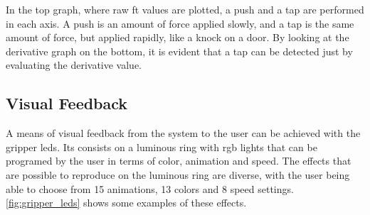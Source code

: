 \par In the top graph, where raw \ac{ft} values are plotted, a push and a tap are performed in each axis. A push is an amount of force applied slowly, and a tap is the same amount of force, but applied rapidly, like a knock on a door. By looking at the derivative graph on the bottom, it is evident that a tap can be detected just by evaluating the derivative value. 



\subsection{Visual Feedback}


\par A means of visual feedback from the system to the user can be achieved with the gripper \acp{led}. Its consists on a luminous ring with \ac{rgb} lights that can be programed by the user in terms of color, animation and speed. The effects that are possible to reproduce on the luminous ring are diverse, with the user being able to choose from 15 animations, 13 colors and 8 speed settings. \autoref{fig:gripper_leds} shows some examples of these effects.

